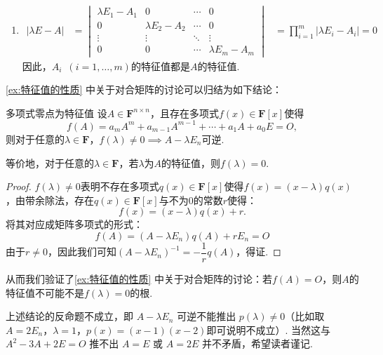 \begin{solution}
\begin{enumerate}
        \item \begin{align*}
                  |\lambda E-A| & =\begin{vmatrix}
                                       \lambda E_1-A_1 & 0               & \cdots & 0               \\
                                       0               & \lambda E_2-A_2 & \cdots & 0               \\
                                       \vdots          & \vdots          & \ddots & \vdots          \\
                                       0               & 0               & \cdots & \lambda E_m-A_m
                                   \end{vmatrix}
                                & =\prod_{i=1}^{m}|\lambda E_i-A_i|=0
              \end{align*}
              因此，$A_i\enspace(i=1,\ldots,m)$的特征值都是$A$的特征值.
    \end{enumerate}
\end{solution}

\autoref{ex:特征值的性质} 中关于对合矩阵的讨论可以归结为如下结论：
\begin{example}{}{多项式零点为特征值}
    设$A \in \mathbf{F}^{n \times n}$，且存在多项式$f(x)\in \mathbf{F}[x]$使得 \[f(A)=a_mA^m+a_{m-1}A^{m-1}+\cdots+a_1A+a_0E=O,\]则对于任意的$\lambda \in \mathbf{F}$，$f(\lambda) \neq 0 \implies A-\lambda E_n$可逆.

    等价地，对于任意的$\lambda \in \mathbf{F}$，若$\lambda$为$A$的特征值，则$f(\lambda)=0$.
\end{example}

\begin{proof}
    $f(\lambda) \neq 0$表明不存在多项式$q(x) \in \mathbf{F}[x]$使得$f(x) = (x - \lambda)q(x)$，由带余除法，存在$q(x) \in \mathbf{F}[x]$与不为0的常数$r$使得：
    \[f(x)=(x - \lambda)q(x) + r.\]
    将其对应成矩阵多项式的形式：
    \[f(A)=(A - \lambda E_n)q(A) + rE_n=O\]
    由于$r \neq 0$，因此我们可知$(A - \lambda E_n)^{-1}=-\dfrac{1}{r}q(A)$，得证.
\end{proof}

从而我们验证了\autoref{ex:特征值的性质} 中关于对合矩阵的讨论：若$f(A)=O$，则$A$的特征值不可能不是$f(\lambda)=0$的根.

上述结论的反命题不成立，即 $A-\lambda E_n$ 可逆不能推出 $p(\lambda) \neq 0$（比如取 $A=2E_n$，$\lambda = 1$，$p(x)=(x-1)(x-2)$即可说明不成立）. 当然这与 $A^2-3A+2E=O$ 推不出 $A=E$ 或 $A=2E$ 并不矛盾，希望读者谨记.

